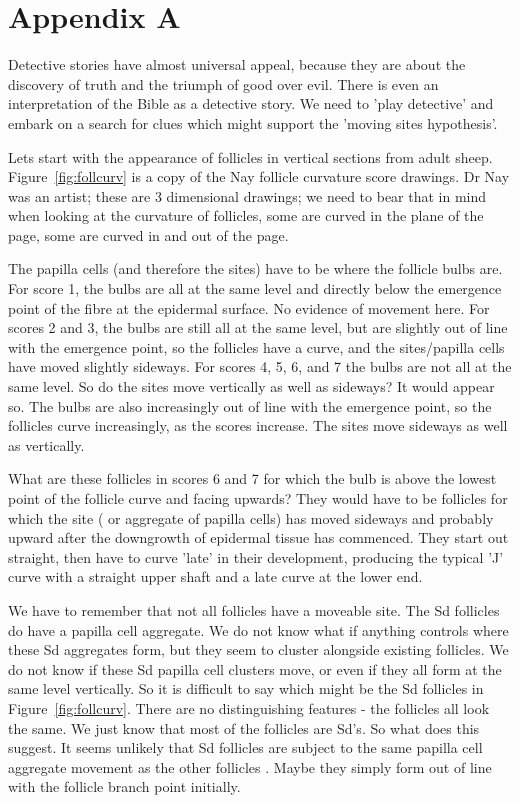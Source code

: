 \documentclass[titlepage]{article}  %
\begin{document}
\appendix
\section{Appendix A}
Detective stories have almost universal appeal, because they are about the discovery of truth and the triumph of good over evil.  There is even an interpretation of the Bible as a detective story. We need to 'play detective' and embark on a search for clues which might support the 'moving sites hypothesis'.

Lets start with the appearance of follicles in vertical sections from adult sheep. Figure~\ref{fig:follcurv} is a copy of the Nay follicle curvature score drawings. Dr Nay was an artist; these are 3 dimensional drawings; we need to bear that in mind when looking at the curvature of follicles, some are curved in the plane of the page, some are curved in and out of the page. 


The papilla cells (and therefore the sites) have to be where the follicle bulbs are. For score 1, the bulbs are all at the same level and directly below the emergence point of the fibre at the epidermal surface. No evidence of movement here. For scores 2 and 3, the bulbs are still all at the same level, but are slightly out of line with the emergence point, so the follicles have a curve, and the sites/papilla cells have moved slightly sideways. For scores 4, 5, 6, and 7 the bulbs are not all at the same level. So do the sites move vertically as well as sideways? It would appear so.  The bulbs are also increasingly out of line with the emergence point, so the follicles curve increasingly, as the scores increase. The sites move sideways as well as vertically. 

What are these follicles in scores 6 and 7 for which the bulb is above the lowest point of the follicle curve and facing upwards?  They would have to be follicles for which the site ( or aggregate of papilla cells) has moved sideways and probably upward after the downgrowth of epidermal tissue has commenced.  They start out straight, then have to curve 'late' in their development, producing the typical 'J' curve with a straight upper shaft and a late curve at the lower end.
 
We have to remember that not all follicles have a moveable site. The Sd follicles  do have a papilla cell aggregate. We do not know  what if anything controls where these Sd aggregates form, but they  seem to cluster alongside existing follicles. We do not know if these Sd papilla cell clusters move, or even if they all form at the same level vertically. So it is difficult to say which might be the Sd follicles in Figure~\ref{fig:follcurv}. There are no distinguishing features - the follicles all look the same. We just know that most of the follicles are Sd's. So what does this suggest. It seems unlikely that  Sd follicles are subject to the same papilla cell aggregate movement as the other follicles . Maybe they simply form out of line with the follicle branch point initially. 
\end{document}
